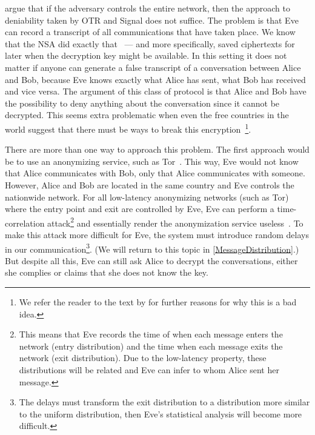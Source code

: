 \textcite{OTPKX} argue that if the adversary controls the entire network, then 
the approach to deniability taken by \ac{OTR} and Signal does not suffice.
The problem is that Eve can record a transcript of all communications
that have taken place.
We know that the \ac{NSA} did exactly that~\cite{XKeyscore} --- and more 
specifically, saved ciphertexts for later when the decryption key might be 
available.
In this setting it does not matter if anyone can generate a false transcript of 
a conversation between Alice and Bob, because Eve knows exactly what Alice has 
sent, what Bob has received and vice versa.
The argument of this class of protocol is that Alice and Bob have the 
possibility to deny anything about the conversation since it cannot be 
decrypted.
This seems extra problematic when even the free countries in the world suggest 
that there must be ways to break this 
encryption~\cite{BackDoorEncryption}\footnote{%
  We refer the reader to the text by \textcite{KeysUnderDoormats} for further 
  reasons for why this is a bad idea.
}.

There are more than one way to approach this problem.
The first approach would be to use an anonymizing service, such as 
Tor~\cite{Tor}.
This way, Eve would not know that Alice communicates with Bob, only that
Alice communicates with someone.
However, Alice and Bob are located in the same country and Eve controls the 
nationwide network.
For all low-latency anonymizing networks (such as Tor) where the entry point 
and exit are controlled by Eve, Eve can perform a time-correlation 
attack\footnote{%
  This means that Eve records the time of when each message enters the network 
  (entry distribution) and the time when each message exits the network (exit 
  distribution).
  Due to the low-latency property, these distributions will be related and Eve 
  can infer to whom Alice sent her message.
} and essentially render the anonymization service 
useless~\cite{SystemsForAnonymousCommunication}.
To make this attack more difficult for Eve, the system must introduce random 
delays in our communication\footnote{%
  The delays must transform the exit distribution to a distribution more 
  similar to the uniform distribution, then Eve's statistical analysis will 
  become more difficult.
}.
(We will return to this topic in \cref{MessageDistribution}.)
But despite all this, Eve can still ask Alice to decrypt the conversations, 
either she complies or claims that she does not know the key.

